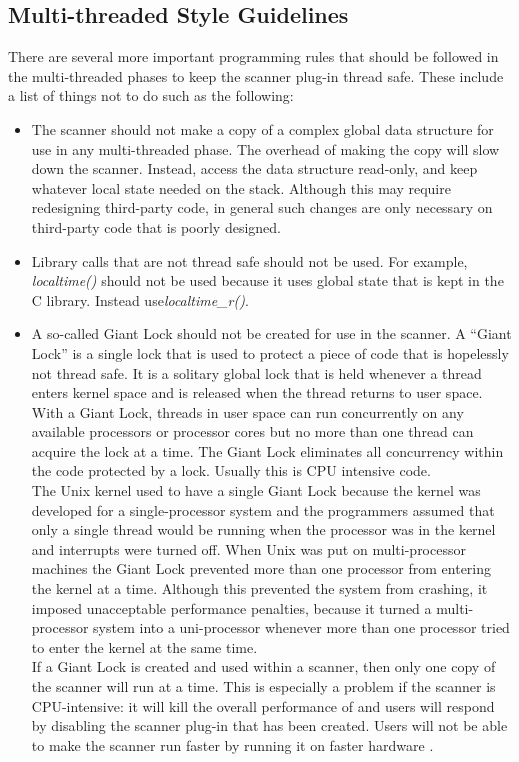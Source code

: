 \documentclass[11pt,fleqn]{article} %
\begin{document}
\subsection{Multi-threaded Style Guidelines}
There are several more important programming rules that should be followed in the multi-threaded phases to keep the
scanner plug-in thread safe. These include a list of things not to do such as the following:
\begin{itemize}
\item The scanner should not make a copy of a complex global data structure for use in any multi-threaded phase. The overhead of making the copy will slow down the scanner. Instead, access the data structure read-only, and keep whatever local state needed on the stack. Although this may require redesigning third-party code, in general such changes are only necessary on third-party code that is poorly designed.

\item Library calls that are not thread safe should not be used. For example, \textit{localtime()} should not be used because it uses global state that is kept in the C library. Instead use\textit{localtime\_r()}.

\item A so-called Giant Lock should not be created for use in the scanner.  A ``Giant Lock'' is a single lock that is used to protect a piece of code that is hopelessly not thread safe. It is a solitary global lock that is held whenever a thread enters kernel space and is released when the thread returns to user space. With a Giant Lock, threads in user space can run concurrently on any available processors or processor cores but no more than one thread can acquire the lock at a time. The Giant Lock eliminates all concurrency within the code protected by a lock. Usually this is CPU intensive code.\\

The Unix kernel used to have a single Giant Lock because the kernel was developed for a single-processor system and the programmers assumed that only a single thread would be running when the processor was in the kernel and interrupts were turned off. When Unix was put on multi-processor machines the Giant Lock prevented more than one processor from entering the kernel at a time. Although this prevented the system from crashing, it imposed unacceptable performance penalties, because it turned a multi-processor system into a uni-processor whenever more than one processor tried to enter the kernel at the same time. \\

If a Giant Lock is created and used within a scanner, then only one copy of the scanner will run at a time. This is especially a problem if the scanner is CPU-intensive: it will kill the overall performance  of \bulk and users will respond by disabling the scanner plug-in that has been created. Users will not be able to make the scanner run faster by running it on faster hardware\cite{programmerstex} . 
\end{itemize} 
\end{document}
